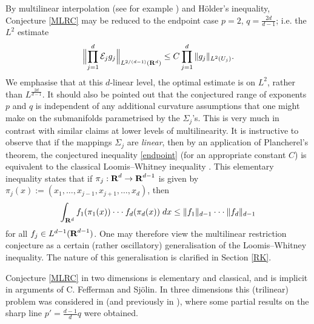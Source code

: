 \begin{remark}\label{Loomis}
By multilinear interpolation (see for example \cite{bergh:interp})
and H\"older's inequality, Conjecture \ref{MLRC}
may be reduced to the endpoint case $p=2$, $q=\tfrac{2d}{d-1}$;
i.e. the $L^{2}$ estimate
\begin{equation}\label{endpoint}
\Bigl\|\prod_{j=1}^{d}{\mathcal{E}}_{j}g_{j}\Bigr\|_{L^{2/(d-1)}({\bf
R}^d)}\leq C\prod_{j=1}^{d} \|g_{j}\|_{L^{2}(U_j)}.
\end{equation}
We emphasise that at this $d$-linear level, the optimal estimate is on
$L^2$, rather than $L^{\frac{2d}{d-1}}$.
It should also be pointed out that the conjectured range of
exponents $p$ and $q$ is independent of any additional curvature
assumptions that one might make on the submanifolds parametrised
by the $\Sigma_{j}$'s. This is very much in contrast with similar
claims at lower levels of multilinearity. It is instructive to
observe that if the mappings $\Sigma_{j}$ are \textit{linear},
then by an application of Plancherel's theorem, the conjectured
inequality \eqref{endpoint} (for an appropriate constant $C$)
is equivalent to the
classical Loomis--Whitney inequality \cite{LW}. This elementary
inequality states that if $\pi_{j}:{\hbox{\bf R}}^{d}\rightarrow{\hbox{\bf R}}^{d-1}$ is
given by $\pi_{j}(x):=(x_{1},\hdots,x_{j-1},x_{j+1},\hdots,x_{d})$,
then
\begin{eqnarray}\label{clw}
\begin{aligned}
\int_{{\bf R}^{d}}f_{1}(\pi_{1}(x))\cdot\cdot\cdot
f_{d}(\pi_{d}(x)) \;dx \leq \|f_{1}\|_{d-1}\cdot\cdot\cdot
\|f_{d}\|_{d-1}
\end{aligned}
\end{eqnarray}
for all $f_{j}\in L^{d-1}({\hbox{\bf R}}^{d-1})$. One may therefore view the
multilinear restriction conjecture as a certain (rather oscillatory)
generalisation of the Loomis--Whitney inequality.
The nature of this generalisation is
clarified in Section \ref{RK}.
\end{remark}
\begin{remark}
Conjecture \ref{MLRC} in two dimensions is elementary and
classical, and is implicit in arguments of C. Fefferman and Sj\"olin.
In three dimensions this
(trilinear) problem was considered in \cite{BCW} (and previously
in \cite{B}), where some partial results on the sharp line $p'=
\tfrac{d-1}{d}q$ were obtained.
\end{remark}

